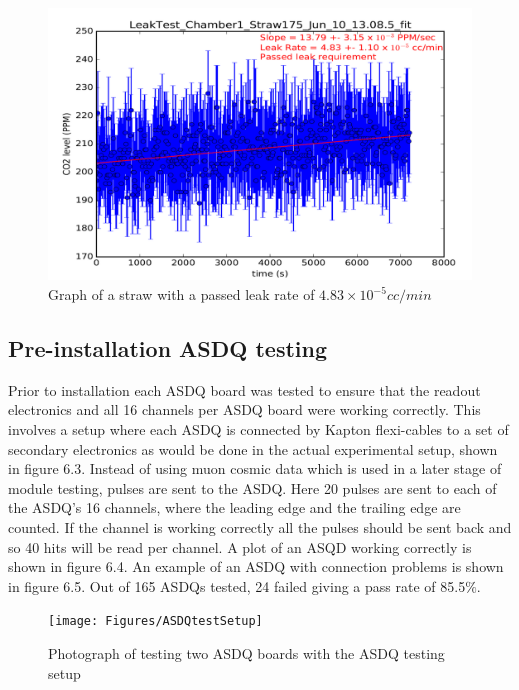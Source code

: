 \begin{figure}[th]
\centering
\includegraphics[scale=0.7]{Figures/leaktestplot}
\decoRule
\caption{Graph of a straw with a passed leak rate of $4.83\times10^{-5}cc/min$}
\label{fig:leaktestplot}
\end{figure}

\subsection {Pre-installation ASDQ testing}

Prior to installation each ASDQ board was tested to ensure that the readout electronics and all 16 channels per ASDQ board were working correctly. This involves a setup where each ASDQ is connected by Kapton flexi-cables to a set of  secondary electronics as would be done in the actual experimental setup, shown in figure 6.3. Instead of using muon cosmic data which is used in a later stage of module testing, pulses are sent to the ASDQ. Here 20 pulses are sent to each of the ASDQ’s 16 channels, where the leading edge and the trailing edge are counted. If the channel is working correctly all the pulses should be sent back and so 40 hits will be read per channel. A plot of an ASQD working correctly is shown in figure 6.4. An example of an ASDQ with connection problems is shown in figure 6.5. Out of 165 ASDQs tested, 24 failed giving a pass rate of 85.5$\%$.
\begin{figure}[th]
\centering
\texttt{[image: Figures/ASDQtestSetup]}
\decoRule
\caption{Photograph of testing two ASDQ boards with the ASDQ testing setup}
\label{fig:ASDQtestSetup}
\end{figure}

